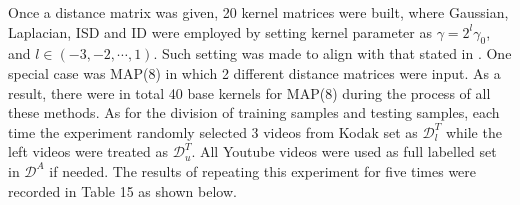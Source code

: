 \noindent Once a distance matrix was given, 20 kernel matrices were built, where Gaussian, Laplacian, ISD and ID were employed by setting kernel parameter as $\gamma = 2^l \gamma_0$, and $l \in (-3, -2,\cdots, 1)$. Such setting was made to align with that stated in \cite{duan2012visual}. One special case was MAP(8) in which 2 different distance matrices were input. As a result, there were in total 40 base kernels for MAP(8) during the process of all these methods. As for the division of training samples and testing samples, each time the experiment randomly selected 3 videos from Kodak set as $\mathcal{D}_l^T$ while the left videos were treated as $\mathcal{D}_u^T$. All Youtube videos were used as full labelled set in $\mathcal{D}^A$ if needed. The results of repeating this experiment for five times were recorded in Table 15 as shown below.\\

\begin{table}[!ht]
  \begin{center}
    \end{center}
    \caption{Experimental settings}
\end{table}


